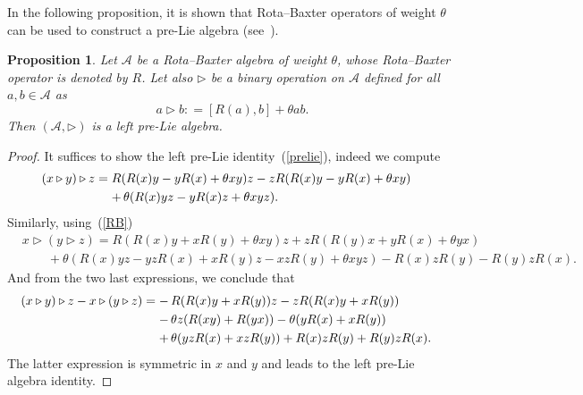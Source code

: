\documentclass[pdftex]{sigma}
\numberwithin{equation}{section}
\newtheorem{pro}[thm]{Proposition}
\theoremstyle{definition}
\begin{document}
In the following proposition, it is shown that Rota--Baxter operators of weight $\theta$ can be used to construct a pre-Lie algebra (see~\cite{Fer, EbraMan}).
\begin{pro}\label{pro1-1}
Let ${\mathcal A}$ be a Rota--Baxter
algebra of weight $\theta$, whose Rota--Baxter operator is denoted by $R$. Let also $\triangleright$ be a
binary operation on ${\mathcal A}$ defined for all $a,b\in \mathcal{A}$ as
\begin{equation*}
 a\triangleright b : = [R(a), b ] + \theta a b. %
\end{equation*}
Then $(\mathcal{A}, \triangleright)$ is a left pre-Lie algebra.
\end{pro}
\begin{proof}
It suffices to show the left pre-Lie identity~(\ref{prelie}), indeed we compute
\begin{align}
(x\triangleright y) \triangleright z={}& R (R(x)y - y R(x) + \theta xy )z -z R (R(x)y - yR(x) +\theta xy ) \cr
&{}{+}\, \theta (R(x)yz - yR(x)z + \theta xyz ). \label{rel1}
\end{align}
Similarly, using~(\ref{RB})
\begin{align}
&x\triangleright (y \triangleright z) =R (R(x)y+x R(y) + \theta xy )z +z R (R(y)x +yR(x) +\theta yx ) \label{rel1b}\\
&\qquad{}+ \theta (R(x)yz - yzR(x) + xR(y)z -xzR(y) +\theta xyz ) -R(x)zR(y)- R(y)z R(x). \nonumber
\end{align}
And from the two last expressions, we conclude that
\begin{align*}
(x\triangleright y) \triangleright z - x\triangleright (y \triangleright z) ={}&{-}\,
R (R(x) y + xR(y) )z - zR (R(x) y + xR(y) )\cr
&{-}\,\theta z (R(xy) + R(yx) ) -
\theta (y R(x) + x R(y) ) \cr
&{+}\, \theta (y z R(x) + xzR(y) ) + R(x)zR(y) + R(y)z R(x). %
\end{align*}
The latter expression is symmetric in $x$ and $y$ and leads to the left pre-Lie algebra identity.
\end{proof}
\end{document}
